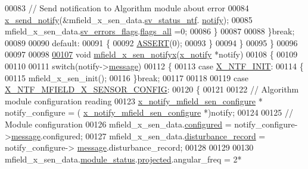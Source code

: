 \begin{DoxyCode}
00083              \textcolor{comment}{// Send notification to Algorithm module about error}
00084              \hyperlink{a00036_ae17b0bb16da3c471bb6074bb4c4d0fee}{x\_send\_notify}(&mfield\_x\_sen\_data.\hyperlink{a00025_a752b00333ec308e07c6bd41aa9a01e73}{sv\_status\_ntf}.
      \hyperlink{a00019_a8e6a04c2283f9fd7b8dcbc62faba5847}{notify});
00085              mfield\_x\_sen\_data.\hyperlink{a00025_aaeec6b0609dba31393f337abf1cce3d3}{sv\_errors\_flags}.\hyperlink{a00022_a1caa87b00c878186140c3bac9c8acf3b}{flags\_all} =0;
00086             \}
00087 
00088         \}\textcolor{keywordflow}{break};
00089 
00090         \textcolor{keywordflow}{default}:
00091         \{
00092             \hyperlink{a00072_abb8ff8e213ac9f6fb21d2b968583b936}{ASSERT}(0);
00093         \}
00094     \}
00095 \}
00096 
00097 
00098 
\hypertarget{a00050_source_l00107}{}\hyperlink{a00050_ac28a2b5f3fa92c0593446e15a63a501c}{00107} \textcolor{keywordtype}{void} \hyperlink{a00050_ac28a2b5f3fa92c0593446e15a63a501c}{mfield\_x\_sen\_notifyx}(\hyperlink{a00036_df/d4c/a00851}{x\_notify} *notify)
00108 \{
00109 
00110 
00111     \textcolor{keywordflow}{switch}(notify->\hyperlink{a00036_adf9665938515a20c283eea2c978cf80d}{message})
00112     \{
00113         \textcolor{keywordflow}{case} \hyperlink{a00036_a620b808f2d7b8d2a03c4d026a4c5423c}{X\_NTF\_INIT}:
00114         \{
00115             mfield\_x\_sen\_init();
00116         \}\textcolor{keywordflow}{break};
00117 
00118 
00119         \textcolor{keywordflow}{case} \hyperlink{a00019_aa16cf9dd51c7cbef48581b7862153ced}{X\_NTF\_MFIELD\_X\_SENSOR\_CONFIG}:
00120         \{
00121 
00122               \textcolor{comment}{// Algorithm module configuration reading}
00123               \hyperlink{a00019_d2/d5e/a00860}{x\_notify\_mfield\_sen\_configure} * notify\_configure = (
      \hyperlink{a00019_d2/d5e/a00860}{x\_notify\_mfield\_sen\_configure} *)notify;
00124 
00125               \textcolor{comment}{// Module configuration}
00126               mfield\_x\_sen\_data.\hyperlink{a00025_a94b2d1f6ea4ab334c74d24984dd27843}{configured} = notify\_configure->\hyperlink{a00019_ae926905663cb8ca01f1bc2d670e428f5}{message}.configured;
00127               mfield\_x\_sen\_data.\hyperlink{a00025_ac9b38e2c1d3f1013a88d33506c754152}{disturbance\_record} = notify\_configure->
      \hyperlink{a00019_ae926905663cb8ca01f1bc2d670e428f5}{message}.disturbance\_record;
00128 
00129 
00130               mfield\_x\_sen\_data.\hyperlink{a00025_adfab5a5d8b45a93dfb13edb24e2b80e3}{module\_status}.\hyperlink{a00019_af2267fb093fb5dcaa006a570a6da3b6b}{projected}.angular\_freq             = 2*

\end{DoxyCode}
